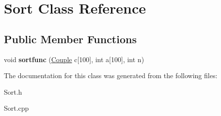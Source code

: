 \hypertarget{classSort}{}\section{Sort Class Reference}
\label{classSort}
\subsection*{Public Member Functions}
\begin{DoxyCompactItemize}
\item 
void {\bfseries sortfunc} (\hyperlink{classCouple}{Couple} c\mbox{[}100\mbox{]}, int a\mbox{[}100\mbox{]}, int n)\hypertarget{classSort_aacbbf3790c196e6635dea189f6b955fd}{}\label{classSort_aacbbf3790c196e6635dea189f6b955fd}

\end{DoxyCompactItemize}


The documentation for this class was generated from the following files\+:\begin{DoxyCompactItemize}
\item 
Sort.\+h\item 
Sort.\+cpp\end{DoxyCompactItemize}
